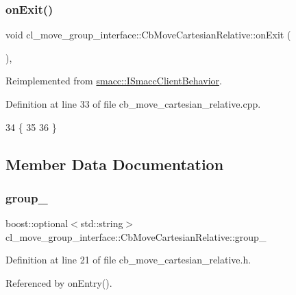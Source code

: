 \subsubsection{\texorpdfstring{on\+Exit()}{onExit()}}
{\footnotesize\ttfamily void cl\+\_\+move\+\_\+group\+\_\+interface\+::\+Cb\+Move\+Cartesian\+Relative\+::on\+Exit (\begin{DoxyParamCaption}{ }\end{DoxyParamCaption})\hspace{0.3cm}{\ttfamily [override]}, {\ttfamily [virtual]}}



Reimplemented from \hyperlink{classsmacc_1_1ISmaccClientBehavior_a36bf771905e3bf750909a15e4215a9b3}{smacc\+::\+I\+Smacc\+Client\+Behavior}.



Definition at line 33 of file cb\+\_\+move\+\_\+cartesian\+\_\+relative.\+cpp.


\begin{DoxyCode}
34 \{
35     
36 \}
\end{DoxyCode}


\subsection{Member Data Documentation}
\mbox{\label{classcl__move__group__interface_1_1CbMoveCartesianRelative_a194d8357267ccd5ee0a10200f1c4cae0}} 
\subsubsection{\texorpdfstring{group\+\_\+}{group\_}}
{\footnotesize\ttfamily boost\+::optional$<$std\+::string$>$ cl\+\_\+move\+\_\+group\+\_\+interface\+::\+Cb\+Move\+Cartesian\+Relative\+::group\+\_\+}



Definition at line 21 of file cb\+\_\+move\+\_\+cartesian\+\_\+relative.\+h.



Referenced by on\+Entry().

